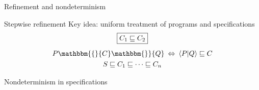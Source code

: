 \documentclass[aspectratio=54]{beamer}
\newcommand{\htr}[3]{{ {#1} \mathbbm{\{} {#2} \mathbbm{\}} {#3} }}
\begin{document}
\begin{frame}{Refinement and nondeterminism} %
  \begin{block}{Stepwise refinement}
  Key idea: uniform treatment of programs and specifications
  \begin{gather*}
    \fbox{$C_1 \sqsubseteq C_2$} \\[1ex]
    \htr{P}{C}{Q} \: \Leftrightarrow \:
      \langle P | Q \rangle \sqsubseteq C \\
    S \sqsubseteq C_1 \sqsubseteq \cdots \sqsubseteq C_n
  \end{gather*}
  \end{block}
  \pause
  \begin{block}{Nondeterminism in specifications}
\end{block}
\end{frame}
\end{document}
